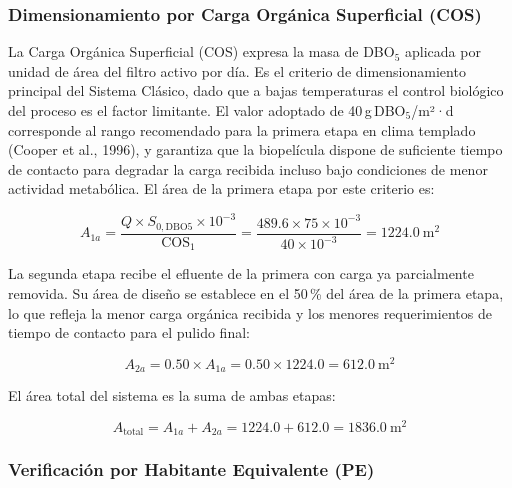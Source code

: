 \documentclass[12pt,a4paper]{article}
\begin{document}
\subsubsection*{Dimensionamiento por Carga Orgánica Superficial (COS)}

La Carga Orgánica Superficial (COS) expresa la masa de DBO$_5$ aplicada por unidad de área del filtro activo por día. Es el criterio de dimensionamiento principal del Sistema Clásico, dado que a bajas temperaturas el control biológico del proceso es el factor limitante. El valor adoptado de 40\,g\,DBO$_5$/m²·d corresponde al rango recomendado para la primera etapa en clima templado (Cooper et al., 1996), y garantiza que la biopelícula dispone de suficiente tiempo de contacto para degradar la carga recibida incluso bajo condiciones de menor actividad metabólica. El área de la primera etapa por este criterio es:

\begin{equation}
A_{1a} = \frac{Q \times S_{0,\text{DBO5}} \times 10^{-3}}{\text{COS}_1} = \frac{489.6 \times 75 \times 10^{-3}}{40 \times 10^{-3}} = 1224.0\ \text{m}^2
\end{equation}

La segunda etapa recibe el efluente de la primera con carga ya parcialmente removida. Su área de diseño se establece en el 50\,\% del área de la primera etapa, lo que refleja la menor carga orgánica recibida y los menores requerimientos de tiempo de contacto para el pulido final:

\begin{equation}
A_{2a} = 0.50 \times A_{1a} = 0.50 \times 1224.0 = 612.0\ \text{m}^2
\end{equation}

El área total del sistema es la suma de ambas etapas:

\begin{equation}
A_\text{total} = A_{1a} + A_{2a} = 1224.0 + 612.0 = 1836.0\ \text{m}^2
\end{equation}

\subsubsection*{Verificación por Habitante Equivalente (PE)}
\end{document}
